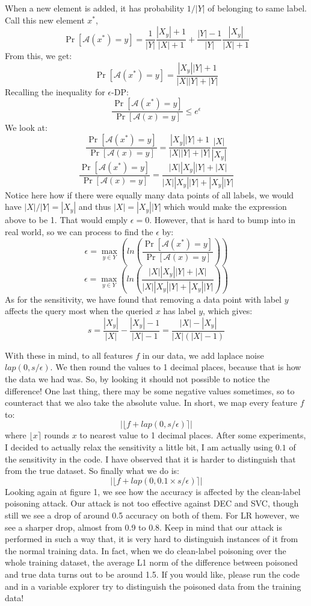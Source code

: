 \documentclass[12pt,reqno]{amsart}
\newcommand{\advrs}[0]{\mathcal{A}}
\begin{document}
\begin{enumerate}[label=(\alph*)]
When a new element is added, it has probability $1/|Y|$ of belonging to same label. Call this new element $x^*$,
$$
\Pr[\advrs(x^*) = y] = \frac{1}{|Y|}\frac{|X_y|+1}{|X|+1} + \frac{|Y|-1}{|Y|}\frac{|X_y|}{|X|+1}
$$
From this, we get:
$$
\Pr[\advrs(x^*) = y] = \frac{|X_y||Y|+1}{|X||Y|+|Y|}
$$
Recalling the inequality for $\epsilon$-DP:
$$
\frac{\Pr[\advrs(x^*) = y]}{\Pr[\advrs(x) = y]} \leq e^{\epsilon}
$$
We look at:
$$
\frac{\Pr[\advrs(x^*) = y]}{\Pr[\advrs(x) = y]} = \frac{|X_y||Y|+1}{|X||Y|+|Y|}\frac{|X|}{|X_y|}
$$
$$
\frac{\Pr[\advrs(x^*) = y]}{\Pr[\advrs(x) = y]} = \frac{|X||X_y||Y|+|X|}{|X||X_y||Y|+|X_y||Y|}
$$
Notice here how if there were equally many data points of all labels, we would have $|X|/|Y| = |X_y|$ and thus $|X| = |X_y||Y|$ which would make the expression above to be 1. That would emply $\epsilon=0$. However, that is hard to bump into in real world, so we can process to find the $\epsilon$ by:
$$
\epsilon = \underset{y \in Y}{\max}\left(ln\left(\frac{\Pr[\advrs(x^*) = y]}{\Pr[\advrs(x) = y]}\right)\right)
$$
$$
\epsilon = \underset{y \in Y}{\max}\left(ln\left(\frac{|X||X_y||Y|+|X|}{|X||X_y||Y|+|X_y||Y|}\right)\right)
$$
As for the sensitivity, we have found that removing a data point with label $y$ affects the query most when the queried $x$ has label $y$, which gives:
$$
s = \frac{|X_y|}{|X|} - \frac{|X_y|-1}{|X|-1} = \frac{|X|-|X_y|}{|X|(|X| - 1)} 
$$

With these in mind, to all features $f$ in our data, we add laplace noise $lap(0, s/\epsilon)$. We then round the values to 1 decimal places, because that is how the data we had was. So, by looking it should not possible to notice the difference! One last thing, there may be some negative values sometimes, so to counteract that we also take the absolute value. In short, we map every feature $f$ to:
$$
|\lfloor f + lap(0, s/\epsilon) \rceil|
$$
where $\lfloor x \rceil$ rounds $x$ to nearest value to 1 decimal places. After some experiments, I decided to actually relax the sensitivity a little bit, I am actually using $0.1$ of the sensitivity in the code. I have observed that it is harder to distinguish that from the true dataset. So finally what we do is:
$$
|\lfloor f + lap(0, 0.1\times s/\epsilon) \rceil|
$$
Looking again at figure 1, we see how the accuracy is affected by the clean-label poisoning attack. Our attack is not too effective against DEC and SVC, though still we see a drop of around 0.5 accuracy on both of them. For LR however, we see a sharper drop, almost from 0.9 to 0.8. Keep in mind that our attack is performed in such a way that, it is very hard to distinguish instances of it from the normal training data. In fact, when we do clean-label poisoning over the whole training dataset, the average L1 norm of the difference between poisoned and true data turns out to be around 1.5. If you would like, please run the code and in a variable explorer try to distinguish the poisoned data from the training data! 


\end{enumerate}
\end{document}
